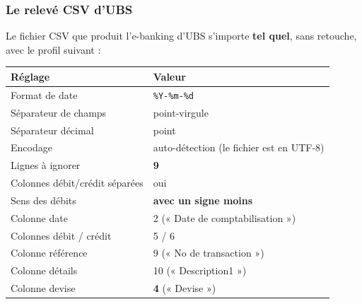 \documentclass[a4paper,11pt,oneside]{article}
\begin{document}
\subsubsection{Le relevé CSV d'UBS}

Le fichier CSV que produit l'e-banking d'UBS s'importe \textbf{tel quel}, sans retouche, avec le profil suivant :

\begin{center}
\begin{tabular}{ll}
\toprule
Réglage & Valeur \\
\midrule
Format de date & \texttt{\%Y-\%m-\%d} \\
Séparateur de champs & point-virgule \\
Séparateur décimal & point \\
Encodage & auto-détection (le fichier est en UTF-8) \\
Lignes à ignorer & \textbf{9} \\
Colonnes débit/crédit séparées & oui \\
Sens des débits & \textbf{avec un signe moins} \\
Colonne date & 2 (« Date de comptabilisation ») \\
Colonnes débit / crédit & 5 / 6 \\
Colonne référence & 9 (« No de transaction ») \\
Colonne détails & 10 (« Description1 ») \\
Colonne devise & \textbf{4} (« Devise ») \\
\bottomrule
\end{tabular}
\end{center}
\end{document}
